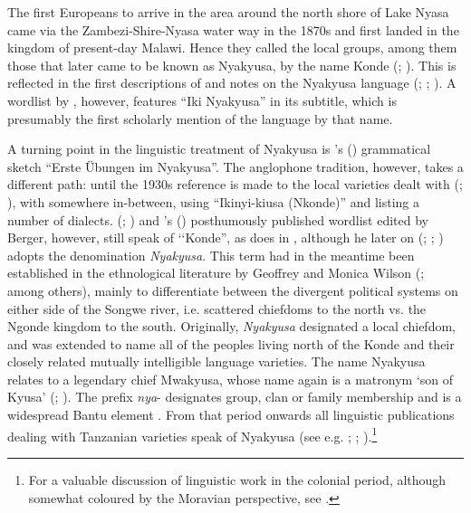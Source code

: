 The first Europeans to arrive in the area around the north shore of Lake Nyasa came via the Zambezi-Shire-Nyasa water way in the 1870s and first landed in the  kingdom of present-day Malawi. Hence they called the local groups, among them those that later came to be known as Nyakyusa, by the name Konde (\citealt[36–40]{PreinP1995}; \citealt[1–5]{WilsonM1963}). This is reflected in the first descriptions of and notes on the Nyakyusa language (\citealt{MeinhofC1966}; \citealt{SchumannK1899}; \citealt{Cleve1904}). A wordlist by \citet{MerenskyA1894}, however, features ``Iki Nyakyusa'' in its subtitle, which is presumably the first scholarly mention of the language by that name.

A turning point in the linguistic treatment of Nyakyusa is \citeauthor{EndemannC1914}'s (\citeyear{EndemannC1914}) grammatical sketch ``Erste Übungen im Nyakyusa''. The anglophone tradition, however, takes a different path: until the 1930s reference is made to the local varieties dealt with (\citealt{BainJ1891}; \citealt{HodsonT1934}), with \citet[208 et passim]{JohnstonH1977} somewhere in-between, using ``Ikinyi-kiusa (Nkonde)'' and listing a number of dialects. \citeauthor{BergerP1933} (\citeyear{BergerP1933}; \citeyear{BergerP1938}) and \citeauthor{StolzA1934}'s (\citeyear{StolzA1934}) posthumously published wordlist edited by Berger, however, still speak of \lq\lq Konde'', as does \citeauthor{BusseJ1942} in \citeyear{BusseJ1942}, although he later on (\citeyear{BusseJ1949}; \citeyear{BusseJ1957}; \citeyear{BusseJnd}) adopts the denomination \textit{Nyakyusa}. This term had in the meantime been established in the ethnological literature by Geoffrey and Monica Wilson (\citeyear{WilsonG1936}; \citeyear{WilsonG1937} among others), mainly to differentiate between the divergent political systems on either side of the Songwe river, i.e. scattered chiefdoms to the north vs. the Ngonde kingdom to the south. Originally, \textit{Nyakyusa} designated a local chiefdom, and was extended to name all of the peoples living north of the Konde and their closely related mutually intelligible language varieties. The name Nyakyusa relates to a legendary chief Mwakyusa, whose name again is a matronym `son of Kyusa' (\citealt[42f]{LabroussiC1998}; \citealt[91–95]{WeberP1998}). The prefix \textit{nya}- designates group, clan or family membership and is a widespread Bantu element \citep{MeeussenA1967}. From that period onwards all linguistic publications dealing with Tanzanian varieties speak of Nyakyusa (see e.g. \citealt{GuthrieM1967}; \citealt{MwangokaNVoorhoeveJ1960b}; \citealt{vanEssenOKaehler-MeyerE1969}).\footnote{For a valuable discussion of linguistic work in the colonial period, although somewhat coloured by the Moravian perspective, see \citet{KroegerR2011}.}
